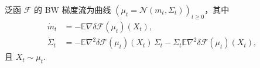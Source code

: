 \begin{theorem}\label{thm:5.22}
泛函 $\mathcal F$ 的 BW 梯度流为曲线 $(\mu_t=\mathcal N(m_t,\Sigma_t))_{t\geq0}$，其中
\begin{equation}\label{eq:5.16}
\begin{aligned}
\dot m_t&=-\mathbb E\nabla\delta\mathcal F(\mu_t)(X_t),\\
\dot\Sigma_t&=-\mathbb E\nabla^2\delta\mathcal F(\mu_t)(X_t)\,\Sigma_t
-\Sigma_t\mathbb E\nabla^2\delta\mathcal F(\mu_t)(X_t),
\end{aligned}
\end{equation}
且 $X_t\sim\mu_t$.
\end{theorem}
